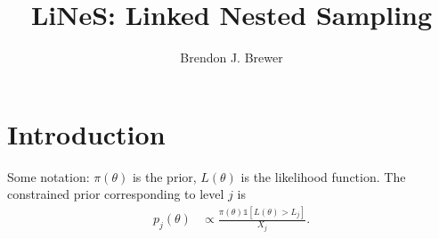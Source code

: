 \documentclass[a4paper, 12pt]{article}
\title{LiNeS: Linked Nested Sampling}
\author{Brendon J. Brewer}
\date{}
\begin{document}
\maketitle


\setlength{\parindent}{0pt}
\setlength{\parskip}{8pt}

\section{Introduction}
Some notation: $\pi(\theta)$ is the prior, $L(\theta)$ is the
likelihood function. The constrained prior corresponding
to level $j$ is
\begin{align}
p_j(\theta) &\propto
\frac{\pi(\theta)\mathds{1}\left[L(\theta) > L_j\right]}
{X_j}.
\end{align}

\begin{thebibliography}{999}
\end{thebibliography}
\end{document}
